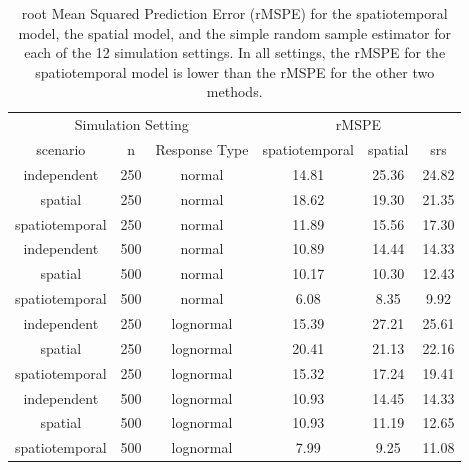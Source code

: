 \documentclass[]{interact}
\theoremstyle{plain}%
\theoremstyle{definition}
\theoremstyle{remark}
\begin{document}
\begin{table}[H]

\caption{\label{tab:simrmspetab}root Mean Squared Prediction Error (rMSPE) for the spatiotemporal model, the spatial model, and the simple random sample estimator for each of the 12 simulation settings. In all settings, the rMSPE for the spatiotemporal model is lower than the rMSPE for the other two methods.}
\centering
\begin{tabular}[t]{cccccc}
\toprule
\multicolumn{3}{c}{Simulation Setting} & \multicolumn{3}{c}{rMSPE} \\
\cmidrule(l{3pt}r{3pt}){1-3} \cmidrule(l{3pt}r{3pt}){4-6}
scenario & n & Response Type & spatiotemporal & spatial & srs\\
\midrule
independent & 250 & normal & 14.81 & 25.36 & 24.82\\
spatial & 250 & normal & 18.62 & 19.30 & 21.35\\
spatiotemporal & 250 & normal & 11.89 & 15.56 & 17.30\\
\midrule
independent & 500 & normal & 10.89 & 14.44 & 14.33\\
spatial & 500 & normal & 10.17 & 10.30 & 12.43\\
spatiotemporal & 500 & normal & 6.08 & 8.35 & 9.92\\
\midrule
independent & 250 & lognormal & 15.39 & 27.21 & 25.61\\
spatial & 250 & lognormal & 20.41 & 21.13 & 22.16\\
spatiotemporal & 250 & lognormal & 15.32 & 17.24 & 19.41\\
\midrule
independent & 500 & lognormal & 10.93 & 14.45 & 14.33\\
spatial & 500 & lognormal & 10.93 & 11.19 & 12.65\\
spatiotemporal & 500 & lognormal & 7.99 & 9.25 & 11.08\\
\bottomrule
\end{tabular}
\end{table}
\end{document}
